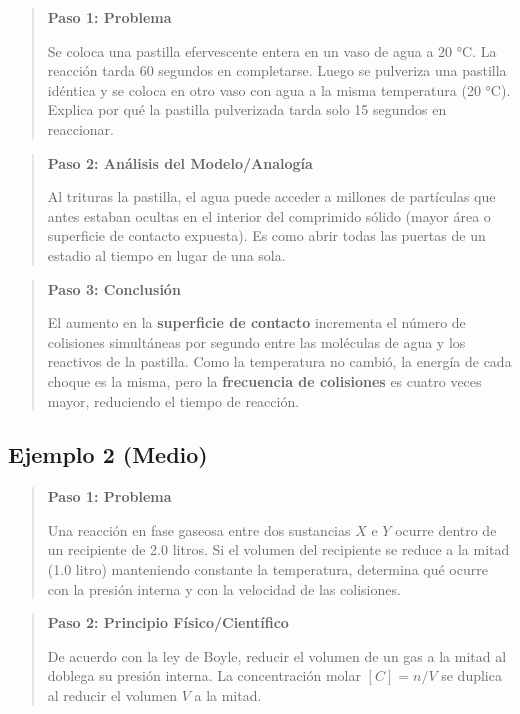 \documentclass[
  spanish,
  letterpaper,
  12pt,
  oneside,
  open=any,
  DIV=15]{scrbook}
\begin{document}
\begin{tcolorbox}
\begin{quote}
\textbf{Paso 1: Problema}

Se coloca una pastilla efervescente entera en un vaso de agua a 20 °C.
La reacción tarda 60 segundos en completarse. Luego se pulveriza una
pastilla idéntica y se coloca en otro vaso con agua a la misma
temperatura (20 °C). Explica por qué la pastilla pulverizada tarda solo
15 segundos en reaccionar.
\end{quote}

\begin{quote}
\textbf{Paso 2: Análisis del Modelo/Analogía}

Al trituras la pastilla, el agua puede acceder a millones de partículas
que antes estaban ocultas en el interior del comprimido sólido (mayor
área o superficie de contacto expuesta). Es como abrir todas las puertas
de un estadio al tiempo en lugar de una sola.
\end{quote}

\begin{quote}
\textbf{Paso 3: Conclusión}

El aumento en la \textbf{superficie de contacto} incrementa el número de
colisiones simultáneas por segundo entre las moléculas de agua y los
reactivos de la pastilla. Como la temperatura no cambió, la energía de
cada choque es la misma, pero la \textbf{frecuencia de colisiones} es
cuatro veces mayor, reduciendo el tiempo de reacción.
\end{quote}

\subsection{Ejemplo 2 (Medio)}\label{ejemplo-2-medio-7}

\begin{quote}
\textbf{Paso 1: Problema}

Una reacción en fase gaseosa entre dos sustancias \(X\) e \(Y\) ocurre
dentro de un recipiente de 2.0 litros. Si el volumen del recipiente se
reduce a la mitad (1.0 litro) manteniendo constante la temperatura,
determina qué ocurre con la presión interna y con la velocidad de las
colisiones.
\end{quote}

\begin{quote}
\textbf{Paso 2: Principio Físico/Científico}

De acuerdo con la ley de Boyle, reducir el volumen de un gas a la mitad
al doblega su presión interna. La concentración molar \([C] = n/V\) se
duplica al reducir el volumen \(V\) a la mitad.
\end{quote}


\end{tcolorbox}
\end{document}
